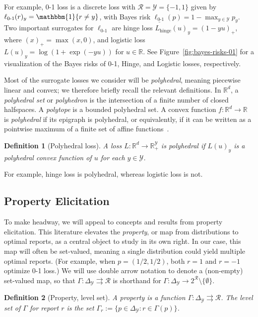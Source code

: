 \documentclass[11pt]{article}
\newcommand{\Comments}{1}
\newcommand{\mynote}[2]{\ifnum\Comments=1\textcolor{#1}{#2}\fi}
\newcommand{\jessie}[1]{\mynote{teal}{[JF: #1]}}
\newcommand{\reals}{\mathbb{R}}
\newcommand{\simplex}{\Delta_\Y}
\newcommand{\R}{\mathcal{R}}
\newcommand{\U}{\mathcal{U}}
\newcommand{\Y}{\mathcal{Y}}
\newcommand{\risk}[1]{\underline{#1}}
\newcommand{\toto}{\rightrightarrows}
\newcommand{\ones}{\mathbbm{1}}
\newcommand{\Ind}[1]{\ones\{#1\}}
\newcommand{\hinge}{L_{\mathrm{hinge}}}
\newcommand{\ellzo}{\ell_{\text{0-1}}}
\newtheorem{definition}{Definition}
\begin{document}
For example, 0-1 loss is a discrete loss with $\R = \Y = \{-1,1\}$
given by $\ellzo(r)_y = \Ind{r \neq y}$, with Bayes risk $\risk{\ellzo}(p) = 1-\max_{y\in\Y} p_y$.
Two important surrogates for $\ellzo$ are hinge loss $\hinge(u)_y = (1-yu)_+$, where $(x)_+ = \max(x,0)$, and logistic loss $L(u)_y = \log(1+\exp(-yu))$ for $u\in\reals$.
See Figure~\ref{fig:bayes-risks-01} for a visualization of the Bayes risks of 0-1, Hinge, and Logistic losses, respectively.

Most of the surrogate losses we consider will be \emph{polyhedral}, meaning piecewise linear and convex; we therefore briefly recall the relevant definitions.
In $\reals^d$, a \emph{polyhedral set} or \emph{polyhedron} is the intersection of a finite number of closed halfspaces.
A \emph{polytope} is a bounded polyhedral set.
A convex function $f:\reals^d\to\reals$ is \emph{polyhedral} if its epigraph is polyhedral, or equivalently, if it can be written as a pointwise maximum of a finite set of affine functions~\citep{rockafellar1997convex}.
%
\begin{definition}[Polyhedral loss]
  A loss $L: \reals^d \to \reals^{\Y}_+$ is \emph{polyhedral} if $L(u)_y$ is a polyhedral convex function of $u$ for each $y\in\Y$.
\end{definition}
%
For example, hinge loss is polyhedral, whereas logistic loss is not.

\subsection{Property Elicitation}
\label{sec:property-elicitation}

To make headway, we will appeal to concepts and results from property elicitation.
This literature elevates the \emph{property}, or map from distributions to optimal reports, as a central object to study in its own right.
In our case, this map will often be set-valued, meaning a single distribution could yield multiple optimal reports.
(For example, when $p=(1/2,1/2)$, both $r=1$ and $r=-1$ optimize 0-1 loss.)
We will use double arrow notation to denote a (non-empty) set-valued map, so that $\Gamma: \simplex \toto \R$ is shorthand for $\Gamma: \simplex \to 2^{\R} \setminus \{\emptyset\}$.

\begin{definition}[Property, level set]\label{def:property}
  A \emph{property} is a function $\Gamma:\simplex\toto\R$.
  The \emph{level set} of $\Gamma$ for report $r$ is the set $\Gamma_r := \{p \in \simplex : r \in \Gamma(p)\}$.
\end{definition}
\end{document}
